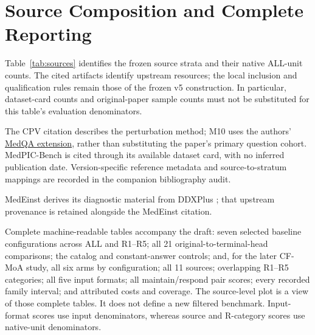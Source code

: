 \section{Source Composition and Complete Reporting}
\label{sec:appendix_sources}

Table~\ref{tab:sources} identifies the frozen source strata and their native ALL-unit counts. The cited
artifacts identify upstream resources; the local inclusion and qualification rules remain
those of the frozen v5 construction. In particular, dataset-card counts and original-paper
sample counts must not be substituted for this table's evaluation denominators.



The CPV citation describes the perturbation method; M10 uses the authors'
\href{https://huggingface.co/datasets/kenza-ily/medqa-cpv}{MedQA extension}, rather than
substituting the paper's primary question cohort. MedPIC-Bench is cited through its
available dataset card, with no inferred publication date. Version-specific reference
metadata and source-to-stratum mappings are recorded in the companion bibliography audit.

MedEinst derives its diagnostic material from DDXPlus \citep{ddxplus}; that upstream
provenance is retained alongside the MedEinst citation.

Complete machine-readable tables accompany the draft: seven selected baseline
configurations across ALL and R1--R5; all 21 original-to-terminal-head comparisons;
the catalog and constant-answer controls; and, for the later CF-MoA study, all six arms by configuration; all
11 sources; overlapping R1--R5 categories; all five input formats; all maintain/respond
pair scores; every recorded family interval; and attributed costs and coverage. The
source-level plot is a view of those complete tables. It does not define a new filtered
benchmark. Input-format scores use input denominators, whereas source and R-category
scores use native-unit denominators.
